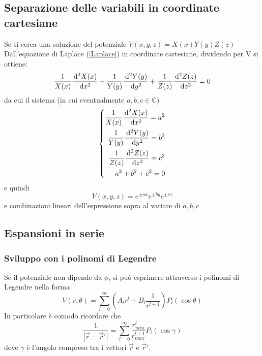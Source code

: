 \documentclass[../main.tex]{subfiles}
\begin{document}
\subsection{Separazione delle variabili in coordinate cartesiane}\label{Separazione}
Se si cerca una soluzione del potenziale $V(x, y, z)=X(x)Y(y)Z(z)$
Dall'equazione di Laplace (\cref{Laplace}) in coordinate cartesiane, dividendo per V si ottiene:
\begin{equation}
  \frac{1}{X(x)}\frac{\,\mathrm d^2X(x)}{\,\mathrm d x^2}+\frac{1}{Y(y)}\frac{\,\mathrm d^2Y(y)}{\,\mathrm d y^2}+\frac{1}{Z(z)}\frac{\,\mathrm d^2Z(z)}{\,\mathrm d z^2}=0
\end{equation}
da cui il sistema (in cui eventualmente $a, b, c \in \mathbb{C}$)
\begin{equation}
  \left\{
    \begin{aligned}
      \frac{1}{X(x)}\frac{\,\mathrm d^2X(x)}{\,\mathrm d x^2}=a^2\\
      \frac{1}{Y(y)}\frac{\,\mathrm d^2Y(y)}{\,\mathrm d y^2}=b^2\\
      \frac{1}{Z(z)}\frac{\,\mathrm d^2Z(z)}{\,\mathrm d z^2}=c^2\\
      a^2+b^2+c^2=0
    \end{aligned}
  \right.
\end{equation}
e quindi
\begin{equation}
  V(x, y, z)=e^{\pm ax}e^{\pm by}e^{\pm cz}
\end{equation}
e combinazioni lineari dell'espressione sopra al variare di $a, b, c$



\subsection{Espansioni in serie}
\subsubsection{Sviluppo con i polinomi di Legendre}
Se il potenziale non dipende da $\phi$, si può esprimere attraverso i polinomi di Legendre nella forma 
\begin{equation}
  \label{Legendre}
  V(r, \theta) = \sum_{l=0}^{\infty} \left ( A_l r^l + B_l \frac{1}{r^{l+1}} \right ) P_l (\cos\theta)
\end{equation}
In particolare è comodo ricordare che
\begin{equation}
  \label{rR} %
  \frac{1}{|\vec r - \vec r'|} = \sum_{l=0}^{\infty} \frac{r_{min}^l}{r_{max}^{l+1}} P_l (\cos\gamma)
\end{equation}
dove $\gamma$ è l'angolo compreso tra i vettori $\vec r$ e $\vec r'$.
\end{document}

